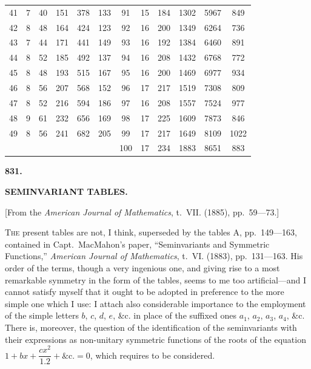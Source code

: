 \documentclass[11pt,a4paper]{book}
\begin{document}
\begin{center}
\begin{tabular}{|c|c|c|c|c|c||c|c|c|c|c|c|}
41 & 7 & 40 & 151 & 378 & 133 & 91 & 15 & 184 & 1302 & 5967 & 849 \\
42 & 8 & 48 & 164 & 424 & 123 & 92 & 16 & 200 & 1349 & 6264 & 736 \\
43 & 7 & 44 & 171 & 441 & 149 & 93 & 16 & 192 & 1384 & 6460 & 891 \\
44 & 8 & 52 & 185 & 492 & 137 & 94 & 16 & 208 & 1432 & 6768 & 772 \\
45 & 8 & 48 & 193 & 515 & 167 & 95 & 16 & 200 & 1469 & 6977 & 934 \\
46 & 8 & 56 & 207 & 568 & 152 & 96 & 17 & 217 & 1519 & 7308 & 809 \\
47 & 8 & 52 & 216 & 594 & 186 & 97 & 16 & 208 & 1557 & 7524 & 977 \\
48 & 9 & 61 & 232 & 656 & 169 & 98 & 17 & 225 & 1609 & 7873 & 846 \\
49 & 8 & 56 & 241 & 682 & 205 & 99 & 17 & 217 & 1649 & 8109 & 1022 \\
\hline
& & & & & & 100 & 17 & 234 & 1883 & 8651 & 883 \\
\hline
\end{tabular}
\end{center}

\newpage
\setcounter{page}{275}


\begin{center}
\Large\textbf{831.}

\bigskip

\Large\textbf{SEMINVARIANT TABLES.}
\end{center}

\begin{center}
[From the \textit{American Journal of Mathematics}, t.~VII. (1885), pp.~59---73.]
\end{center}

\noindent\textsc{The} present tables are not, I think, superseded by the tables A, pp.~149---163, contained in Capt.~MacMahon's paper, ``Seminvariants and Symmetric Functions,'' \textit{American Journal of Mathematics}, t.~VI. (1883), pp.~131---163. His order of the terms, though a very ingenious one, and giving rise to a most remarkable symmetry in the form of the tables, seems to me too artificial---and I cannot satisfy myself that it ought to be adopted in preference to the more simple one which I use: I attach also considerable importance to the employment of the simple letters $b$, $c$, $d$, $e$, \&c. in place of the suffixed ones $a_1$, $a_2$, $a_3$, $a_4$, \&c. There is, moreover, the question of the identification of the seminvariants with their expressions as non-unitary symmetric functions of the roots of the equation $1 + bx + \dfrac{cx^2}{1.2} + \&\text{c.} = 0$, which requires to be considered.
\end{document}

